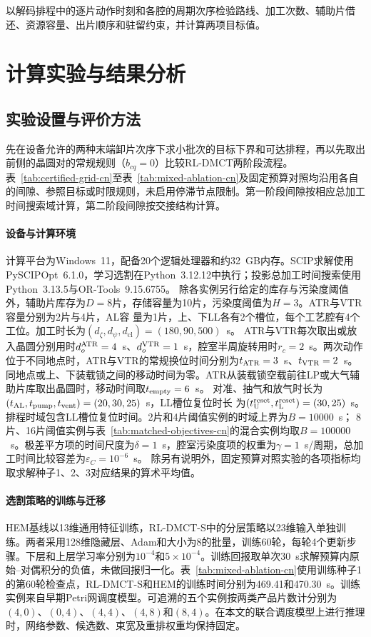 \documentclass[final,5p,times,twocolumn]{elsarticle}
\begin{document}
以解码排程中的逐片动作时刻和各腔的周期次序检验路线、加工次数、辅助片借还、资源容量、出片顺序和驻留约束，并计算两项目标值。

\section{计算实验与结果分析}
\label{sec:experiments-cn}

\subsection{实验设置与评价方法}
\label{sec:experiment-settings-cn}

先在设备允许的两种末端卸片次序下求小批次的目标下界和可达排程，再以先取出前侧的晶圆对的常规规则（$b_{cq}=0$）比较RL-DMCT两阶段流程。表~\ref{tab:certified-grid-cn}至表~\ref{tab:mixed-ablation-cn}及固定预算对照均沿用各自的间隙、参照目标或时限规则，未启用停滞节点限制。第一阶段间隙按相应总加工时间搜索域计算，第二阶段间隙按交接结构计算。

\paragraph{设备与计算环境}
计算平台为Windows~11，配备20个逻辑处理器和约32~GB内存。SCIP求解使用PySCIPOpt~6.1.0，学习选割在Python~3.12.12中执行；投影总加工时间搜索使用Python~3.13.5与OR-Tools~9.15.6755。
除各实例另行给定的库存与污染度阈值外，辅助片库存为$D=8$片，存储容量为10片，污染度阈值为$H=3$。ATR与VTR容量分别为2片与4片，AL容
量为1片，上、下LL各有2个槽位，每个工艺腔有4个工位。加工时长为$(d_\zeta,d_\psi,d_{\mathrm{cl}})=(180,90,500)$~s。
ATR与VTR每次取出或放入晶圆分别用时$d_o^{\rm ATR}=4$~s、$d_o^{\rm VTR}=1$~s，腔室半周旋转用时$r_c=2$~s。两次动作位于不同地点时，ATR与VTR的常规换位时间分别为$t_{\rm ATR}=3$~s、$t_{\rm VTR}=2$~s。同地点或上、下装载锁之间的移动时间为零。ATR从装载锁空载前往LP或大气辅助片库取出晶圆时，移动时间取$t_{\rm empty}=6$~s。
对准、抽气和放气时长为$(t_{\rm AL},t_{\rm pump},t_{\rm vent})=(20,30,25)$~s，LL槽位复位时长
为$(t_{\rm U}^{\rm reset},t_{\rm L}^{\rm reset})=(30,25)$~s。排程时域包含LL槽位复位时间。2片和4片阈值实例的时域上界为$B=10000$~s；
8片、16片阈值实例与表~\ref{tab:matched-objectives-cn}的混合实例均取$B=100000$~s。极差平方项的时间尺度为$\delta=1$~s，腔室污染度项的权重为$\gamma=1$~s/周期，总加工时间比较容差为$\varepsilon_C=10^{-6}$~s。
除另有说明外，固定预算对照实验的各项指标均取求解种子1、2、3对应结果的算术平均值。


\paragraph{选割策略的训练与迁移}
HEM基线以13维通用特征训练，RL-DMCT-S中的分层策略以23维输入单独训练。两者采用128维隐藏层、Adam和大小为8的批量，训练60轮，每轮4个更新步骤。下层和上层学习率分别为$10^{-4}$和$5\times10^{-4}$。训练回报取单次30~s求解预算内原始--对偶积分的负值，未做回报归一化。表~\ref{tab:mixed-ablation-cn}使用训练种子1的第60轮检查点，RL-DMCT-S和HEM的训练时间分别为469.41和470.30~s。训练实例来自早期Petri网调度模型。可追溯的五个实例按两类产品片数计分别为$(4,0)$、$(0,4)$、$(4,4)$、$(4,8)$和$(8,4)$。在本文的联合调度模型上进行推理时，网络参数、候选数、束宽及重排权重均保持固定。
\end{document}
